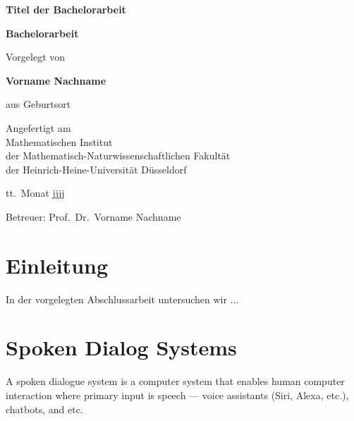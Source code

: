 \documentclass[12pt,titlepage,a4paper]{article}
\begin{document}
\begin{titlepage}
\begin{center}

\textbf{\LARGE Titel der Bachelorarbeit}

\bigskip\bigskip
\textbf{Bachelorarbeit}

\bigskip\bigskip\bigskip
Vorgelegt von

\bigskip
\textbf{Vorname Nachname}

\bigskip
aus Geburtsort


\vfill
Angefertigt am\\
Mathematischen Institut\\ 
der Mathematisch-Naturwissenschaftlichen Fakult\"at\\ 
der Heinrich-Heine-Universit\"at D\"usseldorf

\bigskip
tt.\ Monat jjjj

\bigskip
Betreuer: Prof.\ Dr.\ Vorname Nachname

\end{center}
\end{titlepage}

\thispagestyle{empty}\mbox{}\pagebreak
\setcounter{page}{0}

\tableofcontents
\pagebreak


\section*{Einleitung}

In der vorgelegten Abschlussarbeit untersuchen wir ...

\pagebreak
\section{Spoken Dialog Systems}
A spoken dialogue system is a computer system that enables human computer interaction where primary input is speech --- voice assistants (Siri, Alexa, etc.), chatbots, and etc. \par
\end{document}
